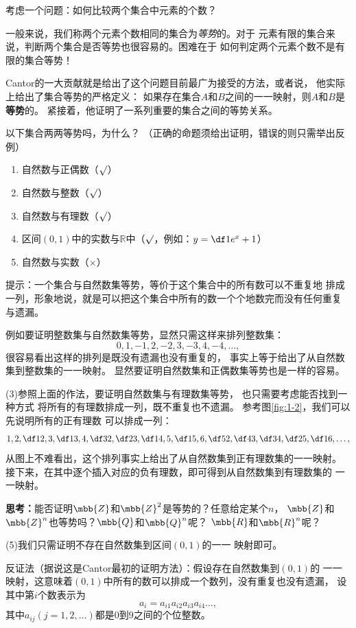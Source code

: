 \begin{shaded}
	考虑一个问题：如何比较两个集合中元素的个数？

	一般来说，我们称两个元素个数相同的集合为{\it 等势}的。对于
	元素有限的集合来说，判断两个集合是否等势也很容易的。困难在于
	如何判定两个元素个数不是有限的集合等势！

	Cantor的一大贡献就是给出了这个问题目前最广为接受的方法，或者说，
	他实际上给出了集合等势的严格定义：
	如果存在集合$A$和$B$之间的一一映射，则$A$和$B$是{\bf 等势}的。
	紧接着，他证明了一系列重要的集合之间的等势关系。
	
	\bs

	\egz 以下集合两两等势吗，为什么？
	（{\baa 正确的命题须给出证明，错误的则只需举出反例}）
	\begin{enumerate}[(1)]
	  \setlength{\itemindent}{1cm}
	  \item 自然数与正偶数（{$\surd$}）
	  \item 自然数与整数（{$\surd$}）
	  \item 自然数与有理数（{$\surd$}）
	  \item 区间$(0,1)$中的实数与$\mathbb{R}$中（{$\surd$}，例如：$y=\df1{e^x+1}$）
	  \item 自然数与实数（{$\times$}）
	\end{enumerate}
	
	\bs
	提示：一个集合与自然数集等势，等价于这个集合中的所有数可以不重复地
	排成一列，形象地说，就是可以把这个集合中所有的数一个个地数完而没有任何重复
	与遗漏。

	例如要证明整数集与自然数集等势，显然只需这样来排列整数集：
	$$0,1,-1,2,-2,3,-3,4,-4,\ldots,$$
	很容易看出这样的排列是既没有遗漏也没有重复的，
	事实上等于给出了从自然数集到整数集的一一映射。
	显然要证明自然数集和正偶数集等势也是一样的容易。
	
	\bs
	(3)\;参照上面的作法，要证明自然数集与有理数集等势，
	也只需要考虑能否找到一种方式
	将所有的有理数排成一列，既不重复也不遗漏。
	参考图\ref{fig:1-2}，我们可以先说明所有的正有理数
	可以排成一列：
	$$1,2,\df12,3,\df13,4,\df32,\df23,\df14,5,\df15,6,\df52,
	\df43,\df34,\df25,\df16,\ldots,$$
	从图上不难看出，这个排列事实上给出了从自然数集到正有理数集的一一映射。
	接下来，在其中逐个插入对应的负有理数，即可得到从自然数集到有理数集的
	一一映射。
	
	{\bf 思考：}能否证明$\mbb{Z}$和$\mbb{Z}^2$是等势的？任意给定某个$n$，
	$\mbb{Z}$和$\mbb{Z}^n$也等势吗？$\mbb{Q}$和$\mbb{Q}^n$呢？
	$\mbb{R}$和$\mbb{R}^n$呢？
	
	(5)\;我们只需证明不存在自然数集到区间$(0,1)$的一一
	映射即可。
	
	反证法（据说这是Cantor最初的证明方法）：假设存在自然数集到$(0,1)$的
	一一映射，这意味着$(0,1)$中所有的数可以排成一个数列，没有重复也没有遗漏，
	设其中第$i$个数表示为
	$$a_i=a_{i1}a_{i2}a_{i3}a_{i4}\ldots,$$
	其中$a_{ij}(j=1,2,\ldots)$都是$0$到$9$之间的个位整数。
	

\end{shaded}

